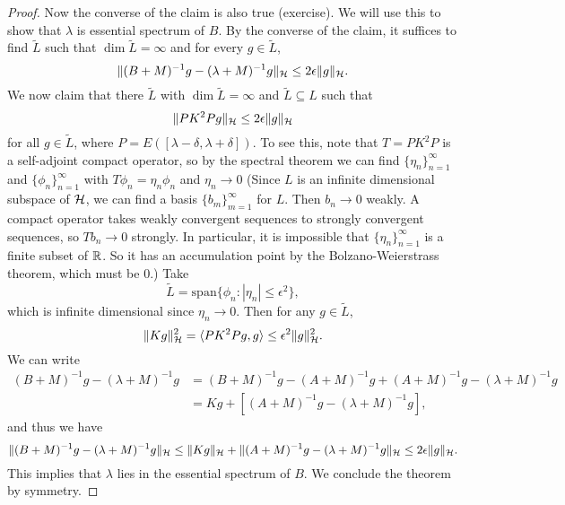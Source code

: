 \begin{proof}
  Now the converse of the claim is also true (exercise).
  We will use this to show that $\lambda$ is
  essential spectrum of $B$. By the converse of
  the claim, it suffices to find $\widetilde{L}$
  such that $\dim \widetilde{L} = \infty$ and
  for every $g \in \widetilde{L}$,
  \[
    \|(B + M)^{-1} g - (\lambda + M)^{-1} g\|_{\mathcal{H}}
    \le 2 \epsilon \|g\|_{\mathcal{H}}.
  \]
  We now claim that there $\widetilde{L}$ with
  $\dim \widetilde{L} = \infty$ and $\widetilde{L} \subseteq L$ such that
  \[
    \|PK^2 P g\|_{\mathcal{H}} \le 2 \epsilon \|g\|_{\mathcal{H}}
  \]
  for all $g \in \widetilde{L}$, where
  $P = E([\lambda - \delta, \lambda + \delta])$.
  To see this, note that $T = PK^2 P$ is a self-adjoint
  compact operator, so by the spectral theorem
  we can find $\{\eta_n\}_{n = 1}^\infty$ and
  $\{\phi_n\}_{n = 1}^\infty$ with
  $T\phi_n = \eta_n \phi_n$ and $\eta_n \to 0$ (Since
  $L$ is an infinite dimensional subspace of $\mathcal{H}$,
  we can find a basis $\{b_m\}_{m = 1}^\infty$ for $L$.
  Then $b_n \to 0$ weakly. A compact operator takes
  weakly convergent sequences to strongly convergent
  sequences, so $T b_n \to 0$ strongly. In particular,
  it is impossible that $\{\eta_n\}_{n = 1}^\infty$ is
  a finite subset of $\mathbb{R}$. So it has an
  accumulation point by the Bolzano-Weierstrass
  theorem, which must be $0$.) Take
  \[
    \widetilde{L} = \mathrm{span}\{\phi_n : |\eta_n| \le \epsilon^2\},
  \]
  which is infinite dimensional since
  $\eta_n \to 0$. Then for any $g \in \widetilde{L}$,
  \[
    \|Kg\|^2_{\mathcal{H}} = \langle PK^2 P g, g \rangle
    \le \epsilon^2 \|g\|^2_{\mathcal{H}}.
  \]
  We can write
  \begin{align*}
    (B + M)^{-1} g - (\lambda + M)^{-1} g
    &= (B + M)^{-1} g - (A + M)^{-1} g
    + (A + M)^{-1} g - (\lambda + M)^{-1} g \\
    &= K g + [(A + M)^{-1} g - (\lambda + M)^{-1} g],
  \end{align*}
  and thus we have
  \[
    \|(B + M)^{-1} g - (\lambda + M)^{-1} g\|_{\mathcal{H}}
    \le \|Kg\|_{\mathcal{H}} + \|(A + M)^{-1} g - (\lambda + M)^{-1} g\|_{\mathcal{H}}
    \le 2 \epsilon \|g\|_{\mathcal{H}}.
  \]
  This implies that $\lambda$ lies in the essential
  spectrum of $B$. We conclude the theorem by symmetry.
\end{proof}

